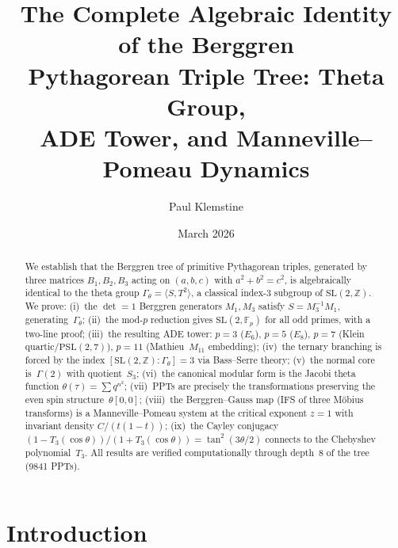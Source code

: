 \documentclass[12pt]{amsart}
\title{The Complete Algebraic Identity of the Berggren\\
Pythagorean Triple Tree: Theta Group,\\
ADE Tower, and Manneville--Pomeau Dynamics}
\author{Paul Klemstine}
\date{March 2026}
\theoremstyle{definition}
\theoremstyle{remark}
\newcommand{\SL}{\mathrm{SL}}
\newcommand{\PSL}{\mathrm{PSL}}
\newcommand{\Fp}{\mathbb{F}_p}
\newcommand{\Z}{\mathbb{Z}}
\newcommand{\Gtheta}{\Gamma_\theta}
\begin{document}
\begin{abstract}
We establish that the Berggren tree of primitive Pythagorean triples,
generated by three matrices $B_1, B_2, B_3$ acting on $(a,b,c)$ with
$a^2+b^2=c^2$, is algebraically identical to the theta group
$\Gtheta = \langle S, T^2\rangle$, a classical index-3 subgroup of
$\SL(2,\Z)$.  We prove:
(i)~the $\det=1$ Berggren generators $M_1, M_3$ satisfy $S = M_3^{-1}M_1$,
generating~$\Gtheta$;
(ii)~the mod-$p$ reduction gives $\SL(2,\Fp)$ for all odd primes, with a
two-line proof;
(iii)~the resulting ADE tower: $p=3$ ($E_6$), $p=5$ ($E_8$), $p=7$ (Klein
quartic/$\PSL(2,7)$), $p=11$ (Mathieu~$M_{11}$ embedding);
(iv)~the ternary branching is forced by the index
$[\SL(2,\Z):\Gtheta]=3$ via Bass--Serre theory;
(v)~the normal core is~$\Gamma(2)$ with quotient~$S_3$;
(vi)~the canonical modular form is the Jacobi theta function
$\theta(\tau)=\sum q^{n^2}$;
(vii)~PPTs are precisely the transformations preserving the even spin
structure~$\theta[0,0]$;
(viii)~the Berggren--Gauss map (IFS of three M\"obius transforms) is a
Manneville--Pomeau system at the critical exponent $z=1$ with invariant
density $C/(t(1-t))$;
(ix)~the Cayley conjugacy
$(1-T_3(\cos\theta))/(1+T_3(\cos\theta)) = \tan^2(3\theta/2)$
connects to the Chebyshev polynomial~$T_3$.
All results are verified computationally through depth~8 of the tree
(9841 PPTs).
\end{abstract}

\maketitle
\tableofcontents

\section{Introduction}\label{sec:intro}
\end{document}
